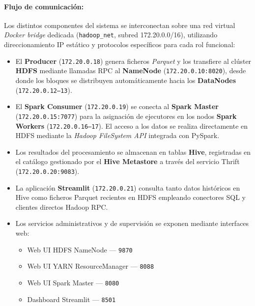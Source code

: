 \documentclass[12pt,a4paper]{article}
\begin{document}
	\paragraph{Flujo de comunicación:}
	
	Los distintos componentes del sistema se interconectan sobre una red virtual \textit{Docker bridge} dedicada (\texttt{hadoop\_net}, subred 172.20.0.0/16), utilizando direccionamiento IP estático y protocolos específicos para cada rol funcional:
	
	\begin{itemize}
		\item El \textbf{Producer} (\texttt{172.20.0.18}) genera ficheros \textit{Parquet} y los transfiere al clúster \textbf{HDFS} mediante llamadas RPC al \textbf{NameNode} (\texttt{172.20.0.10:8020}), desde donde los bloques se distribuyen automáticamente hacia los \textbf{DataNodes} (\texttt{172.20.0.12--13}).
		
		\item El \textbf{Spark Consumer} (\texttt{172.20.0.19}) se conecta al \textbf{Spark Master} (\texttt{172.20.0.15:7077}) para la asignación de ejecutores en los nodos \textbf{Spark Workers} (\texttt{172.20.0.16--17}). El acceso a los datos se realiza directamente en HDFS mediante la \textit{Hadoop FileSystem API} integrada con PySpark.
		
		\item Los resultados del procesamiento se almacenan en tablas \textbf{Hive}, registradas en el catálogo gestionado por el \textbf{Hive Metastore} a través del servicio Thrift (\texttt{172.20.0.20:9083}).
		
		\item La aplicación \textbf{Streamlit} (\texttt{172.20.0.21}) consulta tanto datos históricos en Hive como ficheros Parquet recientes en HDFS empleando conectores SQL y clientes directos Hadoop RPC.
		
		\item Los servicios administrativos y de supervisión se exponen mediante interfaces web:
		\begin{itemize}
			\item Web UI HDFS NameNode — \texttt{9870}
			\item Web UI YARN ResourceManager — \texttt{8088}
			\item Web UI Spark Master — \texttt{8080}
			\item Dashboard Streamlit — \texttt{8501}
		\end{itemize}
	\end{itemize}
	
\end{document}
